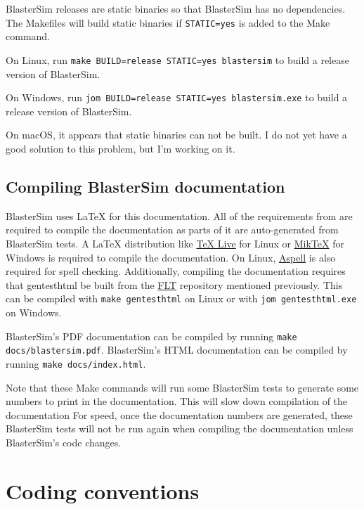 BlasterSim releases are static binaries so that BlasterSim has no dependencies.
The Makefiles will build static binaries if \texttt{STATIC=yes} is added to the Make command.

On Linux, run \texttt{make BUILD=release STATIC=yes blastersim} to build a release version of BlasterSim.

On Windows, run \texttt{jom BUILD=release STATIC=yes blastersim.exe} to build a release version of BlasterSim.

On macOS, it appears that static binaries can not be built.
I do not yet have a good solution to this problem, but I'm working on it.

\subsection{Compiling BlasterSim documentation}\label{compiling-docs}

BlasterSim uses LaTeX for this documentation.
All of the requirements from  are required to compile the documentation as parts of it are auto-generated from BlasterSim tests.
A LaTeX distribution like \href{https://www.tug.org/texlive/}{TeX Live} for Linux or \href{https://miktex.org/}{MikTeX} for Windows is required to compile the documentation.
On Linux, \href{http://aspell.net/}{Aspell} is also required for spell checking.
Additionally, compiling the documentation requires that gentesthtml be built from the \href{https://github.com/btrettel/flt/}{FLT} repository mentioned previously.
This can be compiled with \texttt{make gentesthtml} on Linux or with \texttt{jom gentesthtml.exe} on Windows.

BlasterSim's PDF documentation can be compiled by running \texttt{make docs/blastersim.pdf}.
BlasterSim's HTML documentation can be compiled by running \texttt{make docs/index.html}.

Note that these Make commands will run some BlasterSim tests to generate some numbers to print in the documentation.
This will slow down compilation of the documentation
For speed, once the documentation numbers are generated, these BlasterSim tests will not be run again when compiling the documentation unless BlasterSim's code changes.

\section{Coding conventions}\label{conventions}

